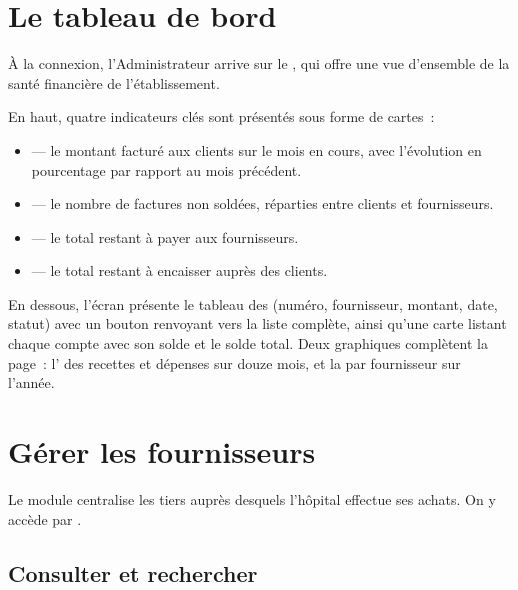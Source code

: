 \section{Le tableau de bord}

À la connexion, l'Administrateur arrive sur le , qui offre une vue d'ensemble de la santé financière de l'établissement.

En haut, quatre indicateurs clés sont présentés sous forme de cartes~:

\begin{itemize}
  \item {} — le montant facturé aux clients sur le mois en cours, avec l'évolution en pourcentage par rapport au mois précédent.
  \item {} — le nombre de factures non soldées, réparties entre clients et fournisseurs.
  \item {} — le total restant à payer aux fournisseurs.
  \item {} — le total restant à encaisser auprès des clients.
\end{itemize}

En dessous, l'écran présente le tableau des  (numéro, fournisseur, montant, date, statut) avec un bouton  renvoyant vers la liste complète, ainsi qu'une carte  listant chaque compte avec son solde et le solde total. Deux graphiques complètent la page~: l' des recettes et dépenses sur douze mois, et la  par fournisseur sur l'année.


\section{Gérer les fournisseurs}

Le module  centralise les tiers auprès desquels l'hôpital effectue ses achats. On y accède par .

\subsection{Consulter et rechercher}

